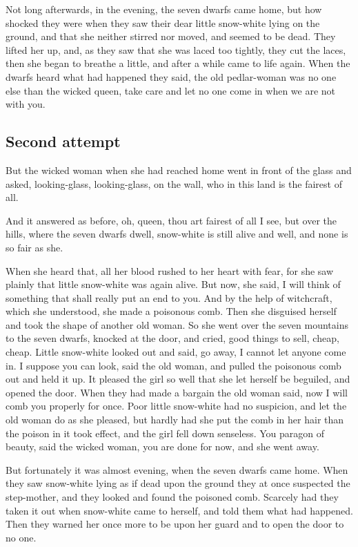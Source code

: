 \documentclass[a4paper,11pt]{article}
\begin{document}
Not long afterwards, in the evening, the seven dwarfs came home,
but how shocked they were when they saw their dear little snow-white
lying on the ground, and that she neither stirred nor
moved, and seemed to be dead.  They lifted her up, and, as they
saw that she was laced too tightly, they cut the laces, then she
began to breathe a little, and after a while came to life again.
When the dwarfs heard what had happened they said, the old
pedlar-woman was no one
else than the wicked queen, take care and let no one come in
when we are not with you.


\subsection{Second attempt}

But the wicked woman when she had reached home went in front
of the glass and asked,
          looking-glass, looking-glass, on the wall,
          who in this land is the fairest of all.

And it answered as before,
          oh, queen, thou art fairest of all I see,
          but over the hills, where the seven dwarfs dwell,
          snow-white is still alive and well,
          and none is so fair as she.

When she heard that, all her blood rushed to her heart with fear,
for she saw plainly that little snow-white was again alive.
But now, she said, I will think of something that shall really
put an end to you.  And by the help of witchcraft, which she
understood, she made a poisonous comb.  Then she disguised
herself and took the shape of another old woman.  So she went
over the seven mountains to the seven dwarfs, knocked at the
door, and cried, good things to sell, cheap, cheap.  Little
snow-white looked out and said, go away, I cannot let anyone come
in.  I suppose you can look, said the old woman, and pulled the
poisonous comb out and held it up.  It pleased the girl so well
that she let herself be beguiled, and opened the door.  When they
had made a bargain the old woman said, now I will comb you
properly for once.  Poor little snow-white had no suspicion, and
let the old woman do as she pleased, but hardly had she put the
comb in her hair than the poison in it took effect, and the girl
fell down senseless.  You paragon of beauty, said the wicked
woman, you are done for now, and she went away.

But fortunately it was almost evening, when the seven dwarfs
came home.  When they saw snow-white lying as if dead upon the
ground they at once suspected the step-mother, and they looked
and found the poisoned comb.  Scarcely had they taken it out when
snow-white came to herself, and told them what had happened.
Then they warned her once more to be upon her guard and to open
the door to no one.
\end{document}
